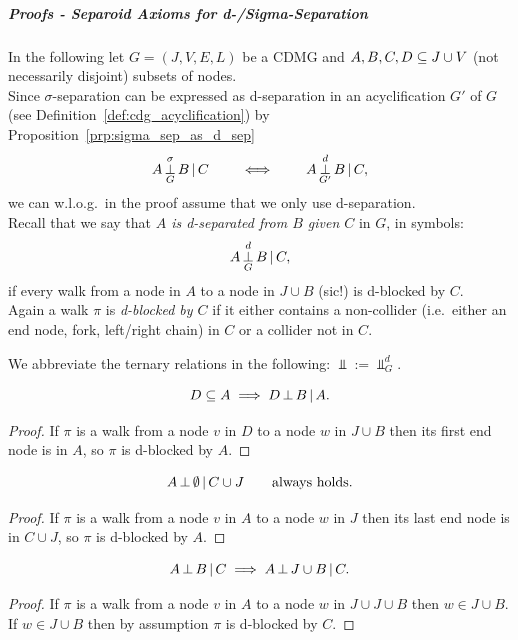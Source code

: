 \subparagraph{Proofs - Separoid Axioms for d-/Sigma-Separation}\hfill%

In the following let $G=(J,V,E,L)$ be a CDMG and $A,B,C,D \subseteq J \cup V$
(not necessarily disjoint) subsets of nodes.\\
Since $\sigma$-separation can be expressed as d-separation in an acyclification $G'$
of $G$ (see Definition~\ref{def:cdg_acyclification}) by Proposition~\ref{prp:sigma_sep_as_d_sep}
\[ A \operatorname*{\perp}^\sigma_G B \operatorname*{|} C  \qquad\iff\qquad A \operatorname*{\perp}^d_{G'} B \operatorname*{|} C, \]
we can w.l.o.g.\ in the proof assume that we only use d-separation.\\

Recall that we say that \emph{$A$ is d-separated from $B$ given $C$} in $G$, in symbols:
    \[ A \operatorname*{\perp}^d_G B \operatorname*{|} C, \]
 if every walk from a node in $A$ to a node in $J \cup B$ (sic!) is d-blocked by $C$. \\
 Again a walk $\pi$ is \emph{d-blocked by $C$} if it either contains a non-collider 
 (i.e.\ either an end node, fork, left/right chain) in $C$ or a collider not in $C$.

 We abbreviate the ternary relations in the following: $\displaystyle \Perp := \Perp_G^d$.


\begin{Lem}
    \[D \subseteq A \implies D \operatorname*{\perp}  B \operatorname*{|} A.\]
\begin{proof}
    If $\pi$ is a walk from a node $v$ in $D$ to a node $w$ in $J \cup B$ then its first end node is in $A$, so $\pi$ is d-blocked by $A$.
\end{proof}
\end{Lem}

\begin{Lem}
    \label{d-sep-restricted-right-redundancy}
    \[A \operatorname*{\perp}  \emptyset \operatorname*{|} C \cup J \qquad \text{always holds.}\]
\begin{proof}
    If $\pi$ is a walk from a node $v$ in $A$ to a node $w$ in $J$ then its last end node is in $C \cup J$, so $\pi$ is d-blocked by $A$.
\end{proof}
\end{Lem}


\begin{Lem}
    \[A \operatorname*{\perp}  B \operatorname*{|} C \implies A \operatorname*{\perp}  J \cup B \operatorname*{|} C.\]
\begin{proof}
 If $\pi$ is a walk from a node $v$ in $A$ to a node $w$ in $J \cup J \cup B$ then $w \in J \cup B$. %
 If $w \in J \cup B$ then by assumption $\pi$ is d-blocked by $C$.
\end{proof}
\end{Lem}

